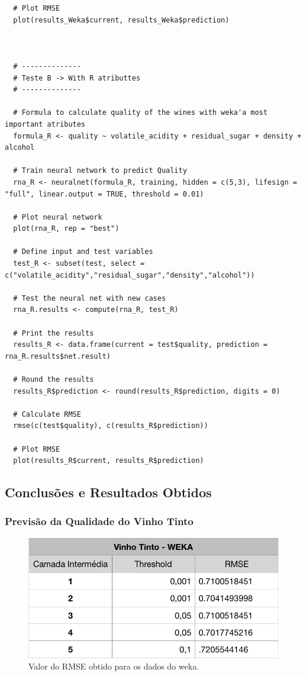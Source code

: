\documentclass{report}
\begin{document}
\begin{verbatim}
  # Plot RMSE
  plot(results_Weka$current, results_Weka$prediction)


  
  # --------------
  #	Teste B	-> With R atributtes
  # --------------
  
  # Formula to calculate quality of the wines with weka'a most important atributes
  formula_R <- quality ~ volatile_acidity + residual_sugar + density + alcohol
  
  # Train neural network to predict Quality
  rna_R <- neuralnet(formula_R, training, hidden = c(5,3), lifesign = "full", linear.output = TRUE, threshold = 0.01)
  
  # Plot neural network
  plot(rna_R, rep = "best")
  
  # Define input and test variables
  test_R <- subset(test, select = c("volatile_acidity","residual_sugar","density","alcohol"))
  
  # Test the neural net with new cases
  rna_R.results <- compute(rna_R, test_R)
  
  # Print the results
  results_R <- data.frame(current = test$quality, prediction = rna_R.results$net.result)
  
  # Round the results
  results_R$prediction <- round(results_R$prediction, digits = 0)
  
  # Calculate RMSE
  rmse(c(test$quality), c(results_R$prediction))
  
  # Plot RMSE
  plot(results_R$current, results_R$prediction)
\end{verbatim}



\subsection{Conclusões e Resultados Obtidos}

\subsubsection{Previsão da Qualidade do Vinho Tinto}

\begin{figure}[H]
\centering
\includegraphics[scale=0.5]{tabelas/1} 
\caption{Valor do RMSE obtido para os dados do weka.}
\end{figure}
\end{document}
